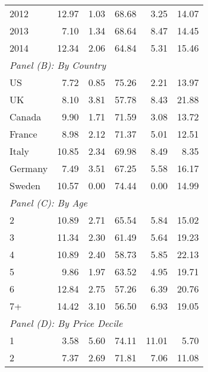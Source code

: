 \begin{table}
\begin{tabular}{lrrrrr}
		2012    &           12.97 &       1.03 &     68.68 &      3.25 &            14.07 \\
		2013    &            7.10 &       1.34 &     68.64 &      8.47 &            14.45 \\
		2014    &           12.34 &       2.06 &     64.84 &      5.31 &            15.46 \\ \hline
		\multicolumn{6}{l}{\textit{Panel (B): By Country}}                                \\ \hline
		US      &            7.72 &       0.85 &     75.26 &      2.21 &            13.97 \\
		UK      &            8.10 &       3.81 &     57.78 &      8.43 &            21.88 \\
		Canada  &            9.90 &       1.71 &     71.59 &      3.08 &            13.72 \\
		France  &            8.98 &       2.12 &     71.37 &      5.01 &            12.51 \\
		Italy   &           10.85 &       2.34 &     69.98 &      8.49 &             8.35 \\
		Germany &            7.49 &       3.51 &     67.25 &      5.58 &            16.17 \\
		Sweden  &           10.57 &       0.00 &     74.44 &      0.00 &            14.99 \\ \hline
		\multicolumn{6}{l}{\textit{Panel (C): By Age}}                                    \\ \hline
		2       &           10.89 &       2.71 &     65.54 &      5.84 &            15.02 \\
		3       &           11.34 &       2.30 &     61.49 &      5.64 &            19.23 \\
		4       &           10.89 &       2.40 &     58.73 &      5.85 &            22.13 \\
		5       &            9.86 &       1.97 &     63.52 &      4.95 &            19.71 \\
		6       &           12.84 &       2.75 &     57.26 &      6.39 &            20.76 \\
		7+      &           14.42 &       3.10 &     56.50 &      6.93 &            19.05 \\ \hline
		\multicolumn{6}{l}{\textit{Panel (D): By Price Decile}}                           \\ \hline
		1       &            3.58 &       5.60 &     74.11 &     11.01 &             5.70 \\
		2       &            7.37 &       2.69 &     71.81 &      7.06 &            11.08 \\

\end{tabular}
\end{table}
